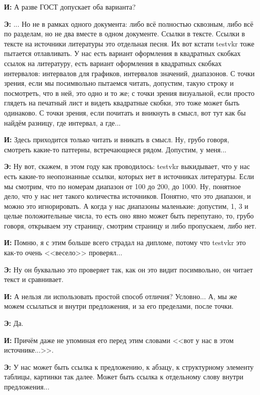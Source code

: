 \textbf{И: }А разве ГОСТ допускает оба варианта?

\textbf{Э: }... Но не в рамках одного документа: либо всё полностью сквозным, либо всё по разделам, но не два вместе в одном документе. Ссылки в тексте. Ссылки в тексте на источники литературы это отдельная песня. Их вот кстати testvkr тоже пытается отлавливать. У нас есть вариант оформления в квадратных скобках ссылок на литературу, есть вариант оформления в квадратных скобках интервалов: интервалов для графиков, интервалов значений, диапазонов. С точки зрения, если мы посимвольно пытаемся читать, допустим, такую строку и посмотреть, что в ней, это одно и то же; с точки зрения визуальной, если просто глядеть на печатный лист и видеть квадратные скобки, это тоже может быть одинаково. С точки зрения, если почитать и вникнуть в смысл, вот тут как бы найдём разницу, где интервал, а где...

\textbf{И: }Здесь приходится только читать и вникать в смысл. Ну, грубо говоря, смотреть какие-то паттерны, встречающиеся рядом. Допустим, у меня...

\textbf{Э: }Ну вот, скажем, в этом году как проводилось: testvkr выкидывает, что у нас есть какие-то неопознанные ссылки, которых нет в источниках литературы. Если мы смотрим, что по номерам диапазон от 100 до 200, до 1000. Ну, понятное дело, что у нас нет такого количества источников. Понятно, что это диапазон, и можно это игнорировать. А когда у нас диапазоны маленькие: допустим, 1, 3 и целые положительные числа, то есть оно явно может быть перепутано, то, грубо говоря, открываем эту страницу, смотрим страницу и либо пропускаем, либо нет.

\textbf{И: }Помню, я с этим больше всего страдал на дипломе, потому что testvkr это как-то очень <<весело>> проверял...

\textbf{Э: }Ну он буквально это проверяет так, как он это видит посимвольно, он читает текст и сравнивает.

\textbf{И: }А нельзя ли использовать простой способ отличия? Условно... А, мы же можем ссылаться и внутри предложения, и за его пределами, после точки.

\textbf{Э: }Да.

\textbf{И: }Причём даже не упоминая его перед этим словами <<вот у нас в этом источнике...>>.

\textbf{Э: }У нас может быть ссылка к предложению, к абзацу, к структурному элементу таблицы, картинки так далее. Может быть ссылка к отдельному слову внутри предложения...

